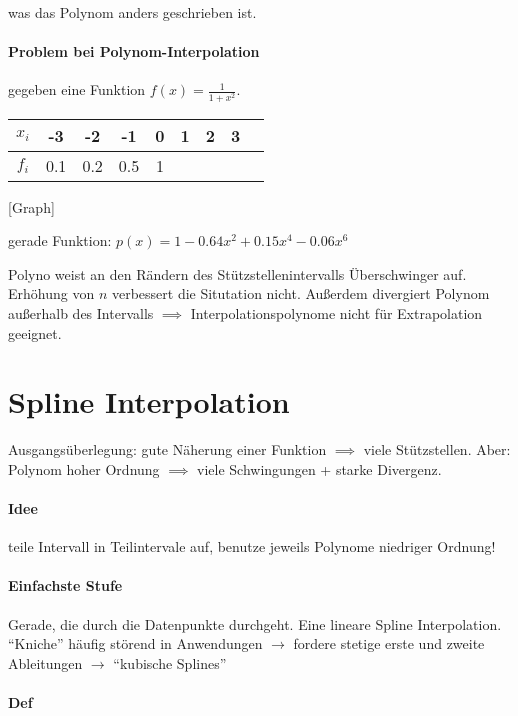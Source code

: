 \documentclass[a4paper,ngerman]{scrbook}
\begin{document}
was das Polynom anders geschrieben ist.

\paragraph{Problem bei Polynom-Interpolation}

gegeben eine Funktion $f(x) = \frac{1}{1+x^2}$.

\begin{tabular}{c|c|c|c|c|c|c|c|c}
  $x_i$ & -3  & -2  & -1  &  0 & 1 & 2 & 3 &\\\hline
  $f_i$ & 0.1 & 0.2 & 0.5 & 1  &  &  &  &
\end{tabular}
[Graph]

gerade Funktion: $p(x) = 1-0.64x^2 + 0.15x^4 - 0.06x^6$

Polyno weist an den Rändern des Stützstellenintervalls Überschwinger auf. Erhöhung von $n$ verbessert die Situtation nicht. Außerdem divergiert Polynom außerhalb des Intervalls $\implies$ Interpolationspolynome nicht für Extrapolation geeignet.

\section{Spline Interpolation}
\label{sec:spline}

Ausgangsüberlegung: gute Näherung einer Funktion $\implies$ viele Stützstellen. Aber: Polynom hoher Ordnung $\implies$ viele Schwingungen + starke Divergenz.

\paragraph{Idee}

teile Intervall in Teilintervale auf, benutze jeweils Polynome niedriger Ordnung!

\paragraph{Einfachste Stufe}

Gerade, die durch die Datenpunkte durchgeht. Eine lineare Spline Interpolation. "`Kniche"' häufig störend in Anwendungen $\to$ fordere stetige erste und zweite Ableitungen $\to$ "`kubische Splines"'

\paragraph{Def}
\end{document}
